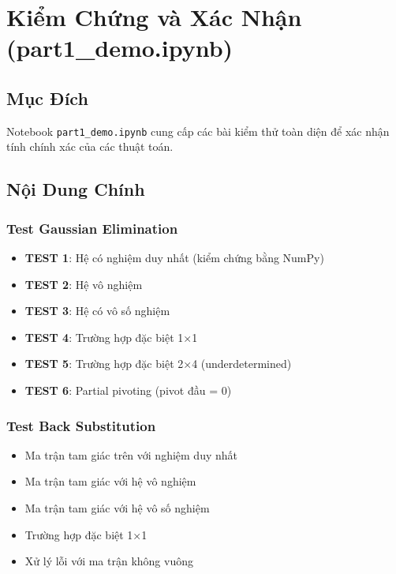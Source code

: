 \documentclass[12pt, a4paper, twoside]{article}
\begin{document}
\section{Kiểm Chứng và Xác Nhận (part1\_demo.ipynb)}

\subsection{Mục Đích}

Notebook \texttt{part1\_demo.ipynb} cung cấp các bài kiểm thử toàn diện để xác nhận tính chính xác của các thuật toán.

\subsection{Nội Dung Chính}

\subsubsection{Test Gaussian Elimination}

\begin{itemize}
    \item \textbf{TEST 1}: Hệ có nghiệm duy nhất (kiểm chứng bằng NumPy)
    \item \textbf{TEST 2}: Hệ vô nghiệm
    \item \textbf{TEST 3}: Hệ có vô số nghiệm
    \item \textbf{TEST 4}: Trường hợp đặc biệt 1×1
    \item \textbf{TEST 5}: Trường hợp đặc biệt 2×4 (underdetermined)
    \item \textbf{TEST 6}: Partial pivoting (pivot đầu = 0)
\end{itemize}

\subsubsection{Test Back Substitution}

\begin{itemize}
    \item Ma trận tam giác trên với nghiệm duy nhất
    \item Ma trận tam giác với hệ vô nghiệm
    \item Ma trận tam giác với hệ vô số nghiệm
    \item Trường hợp đặc biệt 1×1
    \item Xử lý lỗi với ma trận không vuông
\end{itemize}
\end{document}
